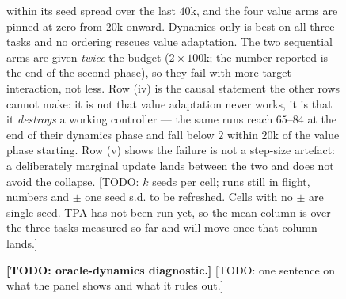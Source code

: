 \documentclass{article} %
\begin{document}
\begin{figure}[t]
\begin{minipage}[t]{0.60\textwidth}
{  within its seed spread over the last $40$k, and the four value arms are pinned
  at zero from $20$k onward.
  Dynamics-only is best on all three tasks and no ordering rescues value
  adaptation. The two sequential arms are given \emph{twice} the budget
  ($2\times100$k; the number reported is the end of the second phase), so they
  fail with more target interaction, not less.
  Row (iv) is the causal statement the other rows cannot make: it is not that
  value adaptation never works, it is that it \emph{destroys} a working
  controller --- the same runs reach $65$--$84$ at the end of their dynamics
  phase and fall below $2$ within $20$k of the value phase starting.
  Row (v) shows the failure is not a step-size artefact: a deliberately marginal
  update lands between the two and does not avoid the collapse.
  [TODO: $k$ seeds per cell; runs still in flight, numbers and $\pm$ one seed
  s.d. to be refreshed. Cells with no $\pm$ are single-seed. TPA has not been
  run yet, so the mean column is over the three tasks measured so far and will
  move once that column lands.]
}
\label{tab:value-adapt}
\end{minipage}\hfill
\begin{minipage}[t]{0.38\textwidth}
\centering
\caption{%
  \textbf{[TODO: oracle-dynamics diagnostic.]}
  [TODO: one sentence on what the panel shows and what it rules out.]
}
\label{fig:oracle-dyn-diag}
\end{minipage}
\end{figure}
\end{document}
